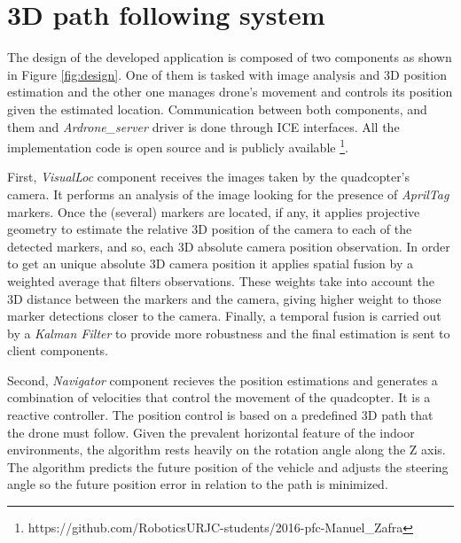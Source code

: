 \documentclass{styles/svproc}
\begin{document}


\section{3D path following system}


The design of the developed application is composed of two components as shown in Figure \ref{fig:design}. One of them is tasked with image analysis and 3D position estimation and the other one manages drone's movement and controls its position given the estimated location. Communication between both components, and them and \textit{Ardrone\_server} driver is done through ICE interfaces. All the implementation code is open source and is publicly available \footnote{https://github.com/RoboticsURJC-students/2016-pfc-Manuel\_Zafra}.

	
	First, \textit{VisualLoc} component receives the images taken by the quadcopter's camera. It performs an analysis of the image looking for the presence of \textit{AprilTag} markers. Once the (several) markers are located, if any, it applies projective geometry to estimate the relative 3D position of the camera to each of the detected markers, and so, each 3D absolute camera position observation. In order to get an unique absolute 3D camera position it applies spatial fusion by a weighted average that filters observations. These weights take into account the 3D distance between the markers and the camera, giving higher weight to those marker detections closer to the camera. Finally, a temporal fusion is carried out by a \textit{Kalman Filter} to provide more robustness and the final estimation is sent to client components.

        Second, \textit{Navigator} component recieves the position estimations and generates a combination of velocities that control the movement of the quadcopter. It is a reactive controller. The position control is based on a predefined 3D path that the drone must follow. Given the prevalent horizontal feature of the indoor environments, the algorithm rests heavily on the rotation angle along the Z axis. The algorithm predicts the future position of the vehicle and adjusts the steering angle so the future position error in relation to the path is minimized.
\end{document}
